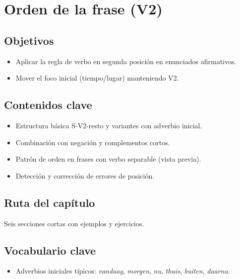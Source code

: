 \chapter{Orden de la frase (V2)}
\section{Objetivos}
\begin{itemize}[leftmargin=*]
	\item Aplicar la regla de verbo en segunda posición en enunciados afirmativos.
	\item Mover el foco inicial (tiempo/lugar) manteniendo V2.
\end{itemize}

\section{Contenidos clave}
\begin{itemize}[leftmargin=*]
	\item Estructura básica S-V2-resto y variantes con adverbio inicial.
	\item Combinación con negación y complementos cortos.
	\item Patrón de orden en frases con verbo separable (vista previa).
	\item Detección y corrección de errores de posición.
\end{itemize}

\section{Ruta del capítulo}
Seis secciones cortas con ejemplos y ejercicios.








\section{Vocabulario clave}
\begin{itemize}[leftmargin=*]
	\item Adverbios iniciales típicos: \textit{vandaag}, \textit{morgen}, \textit{nu}, \textit{thuis}, \textit{buiten}, \textit{daarna}.
\end{itemize}

